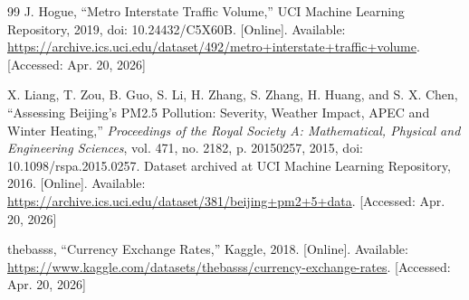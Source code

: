 \documentclass[11pt]{article}
\begin{document}
\begin{thebibliography}{99}
J. Hogue,
``Metro Interstate Traffic Volume,''
UCI Machine Learning Repository, 2019,
doi: 10.24432/C5X60B.
[Online]. Available: \url{https://archive.ics.uci.edu/dataset/492/metro+interstate+traffic+volume}.
[Accessed: Apr. 20, 2026]

X. Liang, T. Zou, B. Guo, S. Li, H. Zhang, S. Zhang, H. Huang, and S. X. Chen,
``Assessing Beijing's PM2.5 Pollution: Severity, Weather Impact, APEC and Winter Heating,''
\textit{Proceedings of the Royal Society A: Mathematical, Physical and Engineering Sciences},
vol. 471, no. 2182, p. 20150257, 2015,
doi: 10.1098/rspa.2015.0257.
Dataset archived at UCI Machine Learning Repository, 2016.
[Online]. Available: \url{https://archive.ics.uci.edu/dataset/381/beijing+pm2+5+data}.
[Accessed: Apr. 20, 2026]

thebasss,
``Currency Exchange Rates,''
Kaggle, 2018.
[Online]. Available: \url{https://www.kaggle.com/datasets/thebasss/currency-exchange-rates}.
[Accessed: Apr. 20, 2026]

\end{thebibliography}
\end{document}
